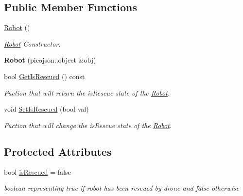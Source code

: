 \subsection*{Public Member Functions}
\begin{DoxyCompactItemize}
\item 
\mbox{\label{classRobot_a4fc7c70ae20623f05e06f2ecb388b6c4}} 
\hyperlink{classRobot_a4fc7c70ae20623f05e06f2ecb388b6c4}{Robot} ()
\begin{DoxyCompactList}\small\item\em \hyperlink{classRobot}{Robot} Constructor. \end{DoxyCompactList}\item 
\mbox{\label{classRobot_aecac52521946272244e9c675a5379583}} 
{\bfseries Robot} (picojson\+::object \&obj)
\item 
bool \hyperlink{classRobot_a9c6db3ebb107d5e25fdb0c21b8cfa2e2}{Get\+Is\+Rescued} () const
\begin{DoxyCompactList}\small\item\em Fuction that will return the is\+Rescue state of the \hyperlink{classRobot}{Robot}. \end{DoxyCompactList}\item 
void \hyperlink{classRobot_aef63efbf557ef2a7bda196980d24375f}{Set\+Is\+Rescued} (bool val)
\begin{DoxyCompactList}\small\item\em Fuction that will change the is\+Rescue state of the \hyperlink{classRobot}{Robot}. \end{DoxyCompactList}\end{DoxyCompactItemize}
\subsection*{Protected Attributes}
\begin{DoxyCompactItemize}
\item 
\mbox{\label{classRobot_aea8d4ffaf91802a2c030f958cd150f03}} 
bool \hyperlink{classRobot_aea8d4ffaf91802a2c030f958cd150f03}{is\+Rescued} = false
\begin{DoxyCompactList}\small\item\em boolean representing true if robot has been rescued by drone and false otherwise \end{DoxyCompactList}\end{DoxyCompactItemize}


